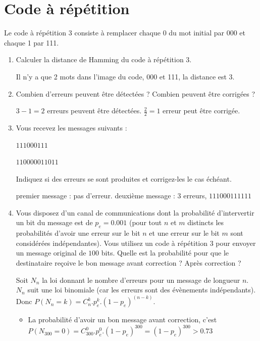 \documentclass[a4paper,10pt]{exam}
\begin{document}
\section{Code à répétition}
Le code à répétition 3 consiste à remplacer chaque 0 du mot initial
par 000 et chaque 1 par 111.

\begin{enumerate}
  \item Calculer la distance de Hamming du code à répétition 3.
    \begin{solution}
      Il n'y a que 2 mots dans l'image du code, 000 et 111, la distance est 3.
    \end{solution}
  \item Combien d'erreurs peuvent être détectées ? Combien peuvent être
    corrigées ?
    \begin{solution}
      $3-1 = 2$ erreurs peuvent être détectées. $\frac{2}{2} = 1$ erreur
      peut être corrigée.
    \end{solution}
  \item Vous recevez les messages suivants :

    $111000111$

    $110000011011$

    Indiquez si des erreurs se sont produites et corrigez-les le cas échéant.
    \begin{solution}
      premier message : pas d'erreur.
      deuxième message : 3 erreurs, $111000111111$
    \end{solution}

  \item Vous disposez d'un canal de communications dont la probabilité
    d'intervertir un bit du message est de $p_e = 0.001$ (pour tout $n$ et $m$
    distincts les probabilités d'avoir une erreur sur le bit $n$ et une erreur sur
    le bit $m$ sont considérées indépendantes). Vous utilisez un code à
    répétition 3 pour envoyer un message original de $100$ bits. Quelle est la
    probabilité pour que le destinataire reçoive le bon message avant correction
    ? Après correction ?

    \begin{solution}
        Soit $N_n$ la loi donnant le nombre d'erreurs pour un message de longueur $n$.
        $N_n$ suit une loi binomiale (car les erreurs sont des évènements
        indépendants). Donc $P(N_n = k) = C_n^k.p_e^{k}.(1-p_e)^{(n-k)}$.

      \begin{itemize}
        \item La probabilité d'avoir un bon message avant correction, c'est
          $P(N_{300}=0) = C_{300}^0.p_e^0.(1-p_e)^{300} = (1-p_e)^{300} > 0.73$


\end{itemize}
\end{solution}
\end{enumerate}
\end{document}
